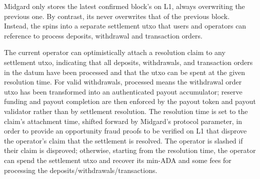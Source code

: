 \documentclass[../midgard.tex]{subfiles}
\begin{document}
Midgard only stores the latest confirmed block's  on L1, always overwriting the previous one.
By contrast, its  never overwrites that of the previous block.
Instead, the  spins into a separate settlement utxo that users and operators can reference to process deposits, withdrawal and transaction orders.

The current operator can optimistically attach a resolution claim to any settlement utxo, indicating that all deposits, withdrawals, and transaction orders in the datum have been processed and that the utxo can be spent at the given resolution time.
For valid withdrawals, processed means the withdrawal order utxo has been transformed into an authenticated payout accumulator; reserve funding and payout completion are then enforced by the payout token and payout validator rather than by settlement resolution.
The resolution time is set to the claim's attachment time, shifted forward by Midgard's  protocol parameter, in order to provide an opportunity fraud proofs to be verified on L1 that disprove the operator's claim that the settlement is resolved.
The operator is slashed if their claim is disproved; otherwise, starting from the resolution time, the operator can spend the settlement utxo and recover its min-ADA and some fees for processing the deposits/withdrawals/transactions.
\end{document}

